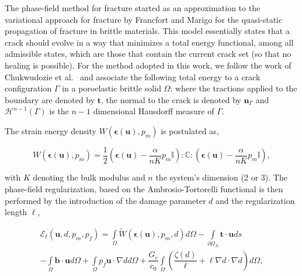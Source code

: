 The phase-field method for fracture started as an approximation \cite{bourdin2000numerical} to the variational approach for fracture by Francfort and Marigo \cite{francfort1998revisiting} for the quasi-static propagation of fracture in brittle materials. This model essentially states that a crack should evolve in a way that minimizes a total energy functional, among all admissible states, which are those that contain the current crack set (so that no healing is possible). For the method adopted in this work, we follow the work of Chukwudozie et al.\ \cite{chukwudozie2019variational} and associate the following total energy to a crack configuration $\Gamma$ in a poroelastic brittle solid $\Omega$:
where the tractions applied to the boundary are denoted by $\textbf{t}$, the normal to the crack is denoted by $\textbf{n}_{\Gamma}$ and $\mathcal{H}^{n-1}(\Gamma)$ is the $n-1$ dimensional Hausdorff measure of $\Gamma$. 

The strain energy density $W(\boldsymbol{\epsilon}(\textbf{u}), p_m)$ is postulated as,

\begin{equation}
    W(\boldsymbol{\epsilon}(\textbf{u}), p_m) = \dfrac{1}{2}\left( \boldsymbol\epsilon(\textbf{u}) - \dfrac{\alpha}{nK} p_m\mathbb{I}\right) : \mathbb{C} : \left( \boldsymbol\epsilon(\textbf{u}) - \dfrac{\alpha}{nK} p_m\mathbb{I}\right),
\end{equation}

\noindent with $K$ denoting the bulk modulus and $n$ the system's dimension (2 or 3). The phase-field regularization, based on the Ambrosio-Tortorelli \cite{ambrosio1990approximation} functional is then performed by the introduction of the damage parameter $d$ and the regularization length $\ell$,

\begin{multline}\label{Poroelastic PF funcional}
    \mathcal{E}_{\ell}(\textbf{u},d,p_m,p_f) = \int\limits_{\Omega }\widetilde{W}(\boldsymbol{\epsilon}(\textbf{u}), p_m, d)d\Omega - \int\limits_{\partial\Omega_N}\textbf{t} \cdot \textbf{u} ds \\
    - \int\limits_{\Omega} \textbf{b} \cdot \textbf{u} d\Omega
    + \int\limits_{\Omega}p_f \textbf{u} \cdot \nabla d d\Omega 
    + \dfrac{G_c}{c_0}\int\limits_{\Omega }\left(\dfrac{\zeta(d)}{\ell} + \ell\nabla d\cdot\nabla d  \right)d\Omega,
\end{multline}

